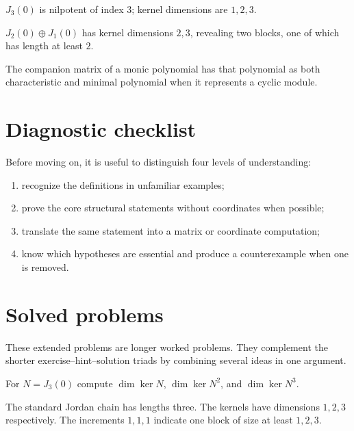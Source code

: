 \begin{example}\label{ex:i12-worked-01}
$J_3(0)$ is nilpotent of index $3$; kernel dimensions are $1,2,3$.
\end{example}

\begin{example}\label{ex:i12-worked-02}
$J_2(0)\oplus J_1(0)$ has kernel dimensions $2,3$, revealing two blocks, one of which has length at least $2$.
\end{example}

\begin{example}\label{ex:i12-worked-03}
The companion matrix of a monic polynomial has that polynomial as both characteristic and minimal polynomial when it represents a cyclic module.
\end{example}

\section{Diagnostic checklist}
Before moving on, it is useful to distinguish four levels of understanding:
\begin{enumerate}
\item recognize the definitions in unfamiliar examples;
\item prove the core structural statements without coordinates when possible;
\item translate the same statement into a matrix or coordinate computation;
\item know which hypotheses are essential and produce a counterexample when one is removed.
\end{enumerate}

\section{Solved problems}
These extended problems are longer worked problems. They complement the shorter exercise--hint--solution triads by combining several ideas in one argument.

\begin{problem}\label{prob:i12-problem-01}
For $N=J_3(0)$ compute $\dim\ker N$, $\dim\ker N^2$, and $\dim\ker N^3$.
\end{problem}
\begin{solution}
The standard Jordan chain has lengths three. The kernels have dimensions $1,2,3$ respectively. The increments $1,1,1$ indicate one block of size at least $1,2,3$.
\end{solution}

